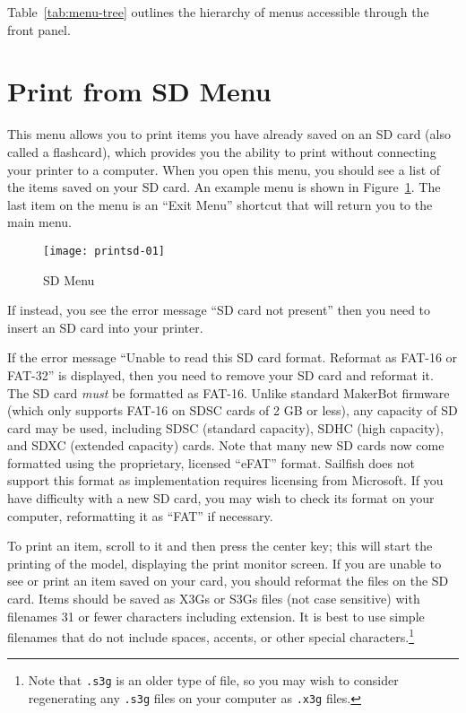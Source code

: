 \ifpdf
Table~\ref{tab:menu-tree} outlines the hierarchy of menus accessible through the front panel.
\fi




\section{Print from SD Menu}\label{sec:sdmenu}

This menu allows you to print items you have already saved on an \gls{SD card} (also called a flashcard), which provides you the ability to print without connecting your printer to a computer.  When you open this menu, you should see a list of the items saved on your SD card.  An example menu is shown in Figure~\ref{fig:sdmenu}.  The last item on the menu is an ``Exit Menu'' shortcut that will return you to the main menu.

\begin{figure}[!htbp]
  \centering
    \texttt{[image: printsd-01]}
    \caption{SD Menu}
  \label{fig:sdmenu}
\end{figure}

\ifpdf
\ifdefined\luluflag
\else
\pagebreak[4]
\fi
\fi

If instead, you see the error message ``SD card not present'' then you need to insert an SD card into your printer.

If the error message ``Unable to read this SD card format.  Reformat as FAT-16 or FAT-32'' is displayed, then you need to remove your SD card and reformat it.  The SD card \emph{must} be formatted as \gls{FAT-16}.  Unlike standard MakerBot firmware (which only supports FAT-16 on SDSC cards of 2 GB or less), any capacity of SD card may be used, including SDSC (standard capacity), SDHC (high capacity), and SDXC (extended capacity) cards.  Note that many new SD cards now come formatted using the proprietary, licensed ``eFAT'' format.  Sailfish does not support this format as implementation requires licensing from Microsoft.  If you have difficulty with a new SD card, you may wish to check its format on your computer, reformatting it as ``FAT'' if necessary.

To print an item, scroll to it and then press the center key; this will start the printing of the model, displaying the print monitor screen. %
If you are unable to see or print an item saved on your card, you should reformat the files on the SD card.  Items should be saved as \glspl{X3G} or \glspl{S3G} files (not case sensitive) with filenames 31 or fewer characters including extension. It is best to use simple filenames that do not include spaces, accents, or other special characters.\footnote{Note that \texttt{.s3g} is an older type of file, so you may wish to consider regenerating any \texttt{.s3g} files on your computer as \texttt{.x3g} files.}

